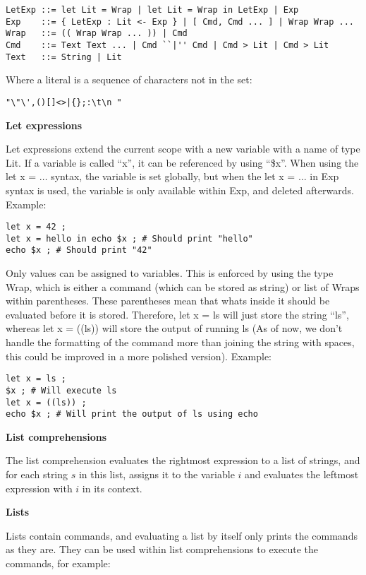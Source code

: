 \documentclass[11pt,a4paper]{article}
\begin{document}
\begin{verbatim}
LetExp ::= let Lit = Wrap | let Lit = Wrap in LetExp | Exp
Exp    ::= { LetExp : Lit <- Exp } | [ Cmd, Cmd ... ] | Wrap Wrap ...
Wrap   ::= (( Wrap Wrap ... )) | Cmd
Cmd    ::= Text Text ... | Cmd ``|'' Cmd | Cmd > Lit | Cmd > Lit
Text   ::= String | Lit
\end{verbatim}

Where a literal is a sequence of characters not in the set:
\begin{verbatim}
"\"\',()[]<>|{};:\t\n "
\end{verbatim}

\textbf{Let expressions}

Let expressions extend the current scope with a new variable with a name of
type Lit. If a variable is called ``x'', it can be referenced by using ``\$x''.
When using the let x = $\dots$ syntax, the variable is set globally, but when
the let x = $\dots$ in Exp syntax is used, the variable is only available
within Exp, and deleted afterwards. Example:

\begin{verbatim}
let x = 42 ;
let x = hello in echo $x ; # Should print "hello"
echo $x ; # Should print "42"
\end{verbatim}

Only values can be assigned to variables. This is enforced by using the type
Wrap, which is either a command (which can be stored as string) or list of
Wraps within parentheses. These parentheses mean that whats inside it should be
evaluated before it is stored. Therefore, let x = ls will just store the string
``ls'', whereas let x = ((ls)) will store the output of running ls (As of now,
we don't handle the formatting of the command more than joining the string with
spaces, this could be improved in a more polished version). Example:

\begin{verbatim}
let x = ls ;
$x ; # Will execute ls
let x = ((ls)) ;
echo $x ; # Will print the output of ls using echo
\end{verbatim}

\textbf{List comprehensions}

The list comprehension evaluates the rightmost expression to a list of strings,
and for each string $s$ in this list, assigns it to the variable $i$ and
evaluates the leftmost expression with $i$ in its context.

\textbf{Lists}

Lists contain commands, and evaluating a list by itself only prints the
commands as they are. They can be used within list comprehensions to execute
the commands, for example:
\end{document}
